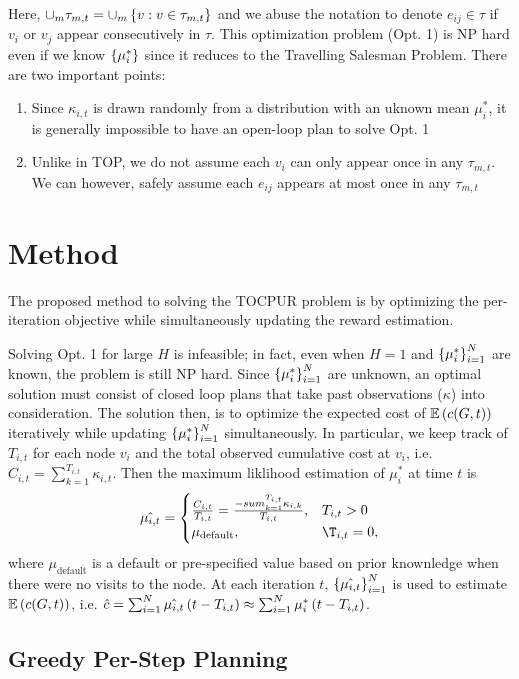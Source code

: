 \documentclass{exam}
\begin{document}
Here, $\cup_m \tau_{m, t} = \cup_m \left \{ v : v\in \tau_{m, t} \right \}$ and we abuse the notation to denote $e_{ij}\in \tau$ if $v_i$ or $v_j$ appear consecutively in $\tau$.
This optimization problem (Opt. 1) is NP hard even if we know $\left \{ \mu_i^* \right \}$ since it reduces to the Travelling Salesman Problem. There are two important points:
\begin{enumerate}
    \item Since $\kappa_{i, t}$ is drawn randomly from a distribution with an uknown mean $\mu_i^*$, it is generally impossible to have an open-loop plan to solve Opt. 1
    \item Unlike in TOP, we do not assume each $v_i$ can only appear once in any $\tau_{m, t}$. We can however, safely assume each $e_{ij}$
    appears at most once in any $\tau_{m, t}$
\end{enumerate}


\section{Method}
The proposed method to solving the TOCPUR problem is by optimizing the per-iteration objective while simultaneously updating the reward estimation.

Solving Opt. 1 for large $H$ is infeasible; in fact, even when $H = 1$ and $\left \{ \mu_i^* \right \}_{i = 1}^N$ are known, the problem is still NP hard.
Since $\left \{ \mu_i^* \right \}_{i = 1}^N$ are unknown, an optimal solution must consist of closed loop plans that take past observations ($\kappa$) into consideration.
The solution then, is to optimize the expected cost of $\mathbb{E}\left( c(G, t) \right)$ iteratively while updating $\left \{ \mu_i^* \right \}_{i = 1}^N$ simultaneously.
In particular, we keep track of $T_{i, t}$ for each node $v_i$ and the total observed cumulative cost at $v_i$, i.e. $C_{i, t} = \sum_{k = 1}^{T_{i, t}} \kappa_{i, t}$. 
Then the maximum liklihood estimation of $\mu_i^*$ at time $t$ is
$$\hat{\mu_{i, t}} = \begin{cases}
    \frac{C_{i, t}}{T_{i, t}} = \frac{-sum_{k = 1}^{T_{i, t}} \kappa_{i, k}}{T_{i, t}}, & T_{i, t} > 0 \\
    \mu_{\text{default}}, & \T_{i, t} = 0,
\end{cases}$$
where $\mu_{\text{default}}$ is a default or pre-specified value based on prior knownledge when there were no visits to the node.
At each iteration $t$, $\left \{ \hat{\mu_{i, t}} \right \}_{i = 1}^N$ is used to estimate $\mathbb{E}\left( c(G, t) \right)$, i.e. 
$\hat{c} = \sum_{i = 1}^N \hat{\mu_{i, t}}\left( t - T_{i, t} \right) \approx \sum_{i = 1}^N \mu_i^*\left( t - T_{i, t} \right)$.

\subsection{Greedy Per-Step Planning}
\end{document}

